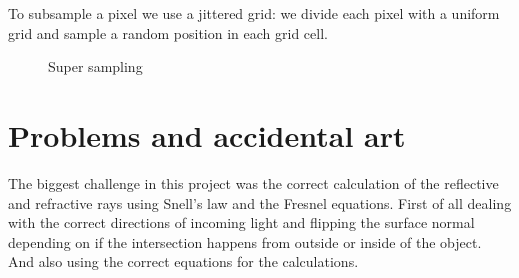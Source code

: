 \documentclass[sigconf, nonacm]{acmart}
\begin{document}
To subsample a pixel we use a jittered grid: we divide each pixel with a uniform grid and sample a random position in each grid cell.

\begin{figure}[ht]
  \centering

  \caption{Super sampling}
  \label{fig:lightSampling}
  \end{figure}


\section{Problems and accidental art}
The biggest challenge in this project was the correct calculation of the reflective and refractive rays using Snell's law and the Fresnel equations.
First of all dealing with the correct directions of incoming light and flipping the surface normal depending on if the intersection happens from outside or inside of the object.
And also using the correct equations for the calculations.
\end{document}
